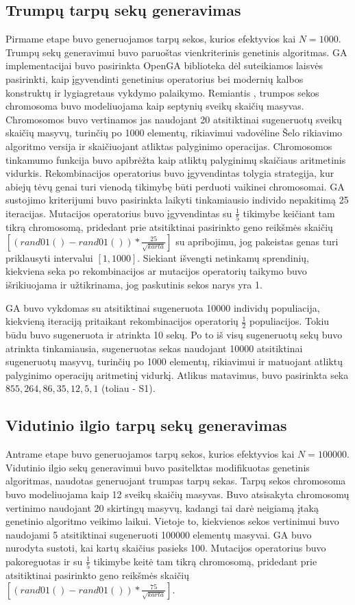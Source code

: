 \documentclass{VUMIFInfKursinis}
\begin{document}
\subsection{Trumpų tarpų sekų generavimas}
Pirmame etape buvo generuojamos tarpų sekos, kurios efektyvios kai $N=1000$.
Trumpų sekų generavimui buvo paruoštas vienkriterinis genetinis algoritmas.
GA implementacijai buvo pasirinkta OpenGA biblioteka \cite{mohammadi2017openga}
dėl suteikiamos laisvės pasirinkti, kaip įgyvendinti genetinius operatorius bei modernių kalbos konstruktų ir lygiagretaus vykdymo palaikymo.
Remiantis \cite{simpson1999faster}, trumpos sekos chromosoma buvo modeliuojama kaip
septynių sveikų skaičių masyvas.
Chromosomos buvo vertinamos jas naudojant 20 atsitiktinai
sugeneruotų sveikų skaičių masyvų, turinčių po 1000 elementų, rikiavimui vadovėline Šelo rikiavimo algoritmo versija ir skaičiuojant atliktas palyginimo operacijas.
Chromosomos tinkamumo funkcija buvo apibrėžta kaip atliktų palyginimų skaičiaus aritmetinis vidurkis.
Rekombinacijos operatorius buvo įgyvendintas tolygia strategija, kur abiejų tėvų genai turi vienodą tikimybę
būti perduoti vaikinei chromosomai.
GA sustojimo kriterijumi buvo pasirinkta laikyti tinkamiausio individo nepakitimą 25 iteracijas.
Mutacijos operatorius buvo įgyvendintas su $\frac{1}{5}$ tikimybe keičiant tam tikrą chromosomą,
pridedant prie atsitiktinai pasirinkto geno reikšmės skaičių $\left[(rand01()-rand01())*\frac{25}{\sqrt{karta}}\right]$ su apribojimu, jog pakeistas genas turi priklausyti intervalui $[1, 1000]$.
Siekiant išvengti netinkamų sprendinių, kiekviena seka po rekombinacijos ar mutacijos operatorių taikymo buvo išrikiuojama ir
užtikrinama, jog paskutinis sekos narys yra 1.

GA buvo vykdomas su atsitiktinai sugeneruota 10000 individų populiacija, kiekvieną iteraciją pritaikant rekombinacijos operatorių
$\frac{1}{2}$ populiacijos.
Tokiu būdu buvo sugeneruota ir atrinkta 10 sekų.
Po to iš visų sugeneruotų sekų buvo atrinkta tinkamiausia, sugeneruotas sekas naudojant 10000 atsitiktinai sugeneruotų masyvų, turinčių po 1000 elementų, rikiavimui
ir matuojant atliktų palyginimo operacijų aritmetinį vidurkį.
Atlikus matavimus, buvo pasirinkta seka $855, 264, 86, 35, 12, 5, 1$ (toliau - S1).

\subsection{Vidutinio ilgio tarpų sekų generavimas}
Antrame etape buvo generuojamos tarpų sekos, kurios efektyvios kai $N=100000$.
Vidutinio ilgio sekų generavimui buvo pasitelktas modifikuotas genetinis algoritmas, naudotas generuojant trumpas tarpų sekas.
Tarpų sekos chromosoma buvo modeliuojama kaip 12 sveikų skaičių masyvas.
Buvo atsisakyta chromosomų vertinimo naudojant 20 skirtingų masyvų, kadangi tai darė neigiamą įtaką genetinio algoritmo veikimo laikui.
Vietoje to, kiekvienos sekos vertinimui buvo naudojami 5 atsitiktinai sugeneruoti 100000 elementų masyvai.
GA buvo nurodyta sustoti, kai kartų skaičius pasieks 100.
Mutacijos operatorius buvo pakoreguotas ir su $\frac{1}{5}$ tikimybe keitė tam tikrą chromosomą,
pridedant prie atsitiktinai pasirinkto geno reikšmės skaičių $\left[(rand01()-rand01())*\frac{75}{\sqrt{karta}}\right]$.
\end{document}
